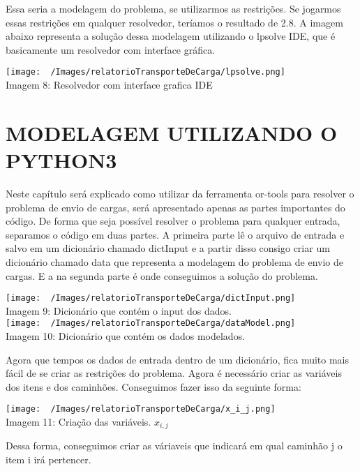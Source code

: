       Essa seria a modelagem do problema, se utilizarmos as restrições. Se jogarmos essas restrições em qualquer resolvedor, teríamos o resultado de 2.8. A imagem abaixo representa a solução dessa modelagem utilizando o lpsolve IDE, que é basicamente um resolvedor com interface gráfica.
      \begin{center}
      \texttt{[image: ~/Images/relatorioTransporteDeCarga/lpsolve.png]}\\
        Imagem 8: Resolvedor com interface grafica IDE
      \end{center}

\chapter{MODELAGEM UTILIZANDO O PYTHON3}
  Neste capítulo será explicado como utilizar da ferramenta or-tools para resolver o problema de envio de cargas, será apresentado apenas as partes importantes do código.
  De forma que seja possível resolver o problema para qualquer entrada, separamos o código em duas partes. A primeira parte lê o arquivo de entrada e salvo em um dicionário chamado dictInput e a partir disso consigo criar um dicionário chamado data que representa a modelagem do problema de envio de cargas. E a na segunda parte é onde conseguimos a solução do problema.
  \begin{center}
    \texttt{[image: ~/Images/relatorioTransporteDeCarga/dictInput.png]}\\
    Imagem 9: Dicionário que contém o input dos dados.\\
    \texttt{[image: ~/Images/relatorioTransporteDeCarga/dataModel.png]}\\
    Imagem 10: Dicionário que contém os dados modelados.\\
  \end{center}

  Agora que tempos os dados de entrada dentro de um dicionário, fica muito mais fácil de se criar as restrições do problema.
  Agora é necessário criar as variáveis dos itens e dos caminhões. Conseguimos fazer isso da seguinte forma:
  \begin{center}
    \texttt{[image: ~/Images/relatorioTransporteDeCarga/x\_i\_j.png]}\\
    Imagem 11: Criação das variáveis. \(x_{i,j}\)
  \end{center}
  Dessa forma, conseguimos criar as váriaveis que indicará em qual caminhão j o item i irá pertencer.


